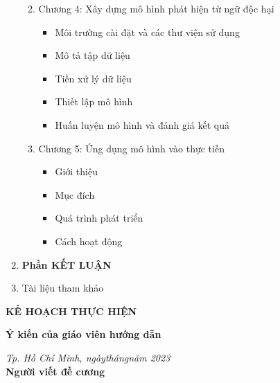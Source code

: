 \begin{enumerate}[label=\textbf{\arabic*.}]
\begin{enumerate}
\begin{itemize}
                    \end{itemize}
              \item Chương 4: Xây dựng mô hình phát hiện từ ngữ độc hại
                    \begin{itemize}
                        \item Môi trường cài đặt và các thư viện sử dụng
                        \item Mô tả tập dữ liệu
                        \item Tiền xử lý dữ liệu
                        \item Thiết lập mô hình
                        \item Huấn luyện mô hình và đánh giá kết quả
                    \end{itemize}
                \item Chương 5: Ứng dụng mô hình vào thực tiễn
                    \begin{itemize}
                        \item Giới thiệu
                        \item Mục đích
                        \item Quá trình phát triển
                        \item Cách hoạt động
                    \end{itemize}
          \end{enumerate}
    \item \textbf{Phần KẾT LUẬN}
    \item Tài liệu tham khảo
          \begin{enumerate}[label={[\arabic*]}]
            \item \dots
            \item \dots
          \end{enumerate}
\end{enumerate}

\textbf{KẾ HOẠCH THỰC HIỆN}


\noindent\begin{minipage}[t]{0.43\textwidth}
    \centering
    \fontsize{11pt}{16.5pt}
    \textbf{Ý kiến của giáo viên hướng dẫn}\\
\end{minipage}
\begin{minipage}[t]{0.57\textwidth}
    \centering
    \fontsize{11pt}{16.5pt}
    \textit{Tp. Hồ Chí Minh, ngày\qquad tháng\qquad năm 2023}\\    
    \textbf{Người viết đề cương}\\
\end{minipage}
